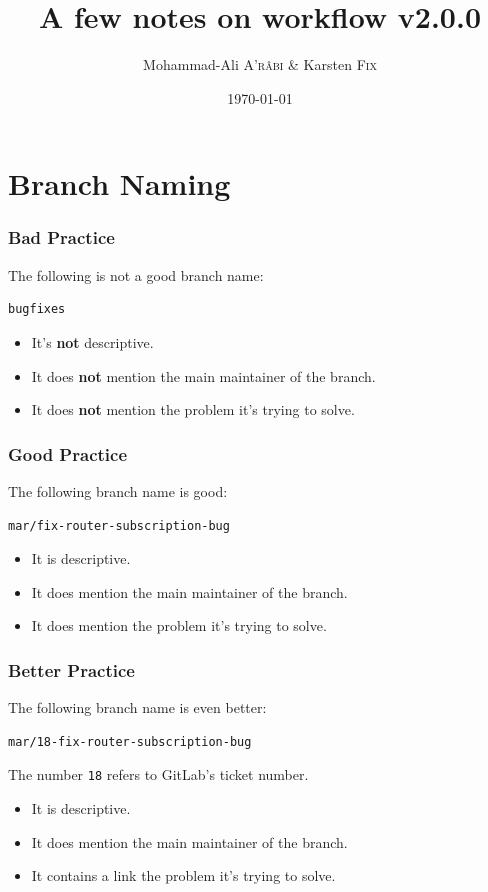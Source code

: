\documentclass[10pt, compress]{beamer}
\title{A few notes on workflow v2.0.0}
\subtitle{}
\date{\today}
\author{Mohammad-Ali \textsc{A'r\^abi} \& Karsten \textsc{Fix}}
\institute{AppTec Services GmbH}
\begin{document}
\maketitle

\section{Branch Naming}

\begin{frame}[fragile]
  \frametitle{Bad Practice}
  
  The following is not a good branch name:
  \begin{verbatim}
bugfixes
  \end{verbatim}
  
  \begin{itemize}
      \item It's \textbf{not} descriptive.
      \item It does \textbf{not} mention the main maintainer of the branch.
      \item It does \textbf{not} mention the problem it's trying to solve.
  \end{itemize}

\end{frame}

\begin{frame}[fragile]
  \frametitle{Good Practice}
  
  The following branch name is good:
  \begin{verbatim}
mar/fix-router-subscription-bug
  \end{verbatim}
  
  \begin{itemize}
      \item It is descriptive.
      \item It does mention the main maintainer of the branch.
      \item It does mention the problem it's trying to solve.
  \end{itemize}

\end{frame}

\begin{frame}[fragile]
  \frametitle{Better Practice}
  
  The following branch name is even better:
  \begin{verbatim}
mar/18-fix-router-subscription-bug
  \end{verbatim}
  
  The number \texttt{18} refers to GitLab's ticket number.
  
  \begin{itemize}
      \item It is descriptive.
      \item It does mention the main maintainer of the branch.
      \item It contains a link the problem it's trying to solve.
  \end{itemize}

\end{frame}
\end{document}
